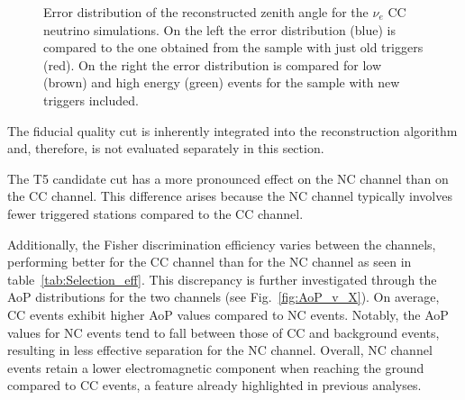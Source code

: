 \begin{figure}[h!]
  \centering
  \hfill
  \caption{Error distribution of the reconstructed zenith angle for the $\nu_e$ CC neutrino simulations. On the left the error distribution (blue)  is compared to the one obtained from the sample with just old triggers (red). On the right the error distribution is compared for low (brown) and high energy (green) events for the sample with new triggers included.} 
  \label{fig:Theta_err_comp}
\end{figure}

The fiducial quality cut is inherently integrated into the reconstruction algorithm and, therefore, is not evaluated separately in this section.

The T5 candidate cut has a more pronounced effect on the NC channel than on the CC channel. This difference arises because the NC channel typically involves fewer triggered stations compared to the CC channel.


Additionally, the Fisher discrimination efficiency varies between the channels, performing better for the CC channel than for the NC channel as seen in table~\ref{tab:Selection_eff}. This discrepancy is further investigated through the \gls{AoP} distributions for the two channels (see Fig.~\ref{fig:AoP_v_X}). On average, CC events exhibit higher AoP values compared to NC events. Notably, the AoP values for NC events tend to fall between those of CC and background events, resulting in less effective separation for the NC channel. Overall, NC channel events retain a lower electromagnetic component when reaching the ground compared to CC events, a feature already highlighted in previous analyses.

